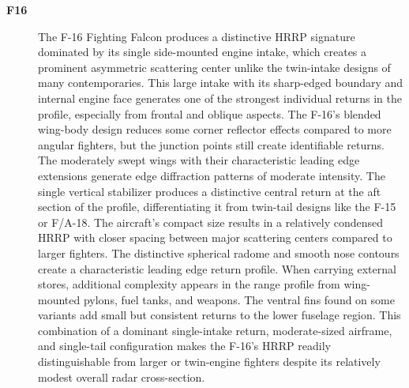 {\begin{description}
    \item[\textbf{F16}]
    The F-16 Fighting Falcon produces a distinctive HRRP signature dominated by its single side-mounted engine intake, which creates a prominent asymmetric scattering center unlike the twin-intake designs of many contemporaries. This large intake with its sharp-edged boundary and internal engine face generates one of the strongest individual returns in the profile, especially from frontal and oblique aspects. The F-16's blended wing-body design reduces some corner reflector effects compared to more angular fighters, but the junction points still create identifiable returns. The moderately swept wings with their characteristic leading edge extensions generate edge diffraction patterns of moderate intensity. The single vertical stabilizer produces a distinctive central return at the aft section of the profile, differentiating it from twin-tail designs like the F-15 or F/A-18. The aircraft's compact size results in a relatively condensed HRRP with closer spacing between major scattering centers compared to larger fighters. The distinctive spherical radome and smooth nose contours create a characteristic leading edge return profile. When carrying external stores, additional complexity appears in the range profile from wing-mounted pylons, fuel tanks, and weapons. The ventral fins found on some variants add small but consistent returns to the lower fuselage region. This combination of a dominant single-intake return, moderate-sized airframe, and single-tail configuration makes the F-16's HRRP readily distinguishable from larger or twin-engine fighters despite its relatively modest overall radar cross-section.


\end{description}}
